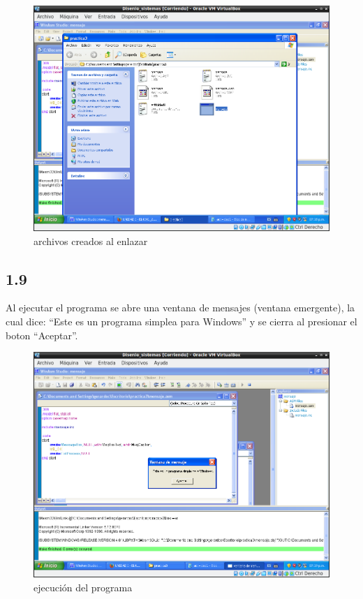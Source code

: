 \begin{figure}[H]
  \includegraphics[width=\linewidth]{practica3/imagenes/actividad1/creados_link.png}
  \caption{archivos creados al enlazar}
\end{figure}

\subsection*{1.9}
Al ejecutar el programa se abre una ventana de mensajes (ventana emergente), la cual dice: ``Este es un programa simplea para Windows'' y se cierra al presionar el boton ``Aceptar''.

\begin{figure}[H]
  \includegraphics[width=\linewidth]{practica3/imagenes/actividad1/ejecucion.png}
  \caption{ejecución del programa}
\end{figure}

